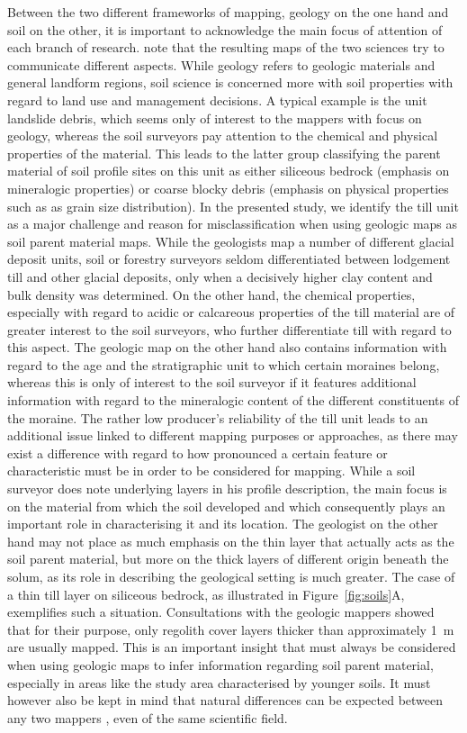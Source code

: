 \documentclass[preprint,12pt,authoryear]{elsarticle}
\begin{document}
Between the two different frameworks of mapping, geology on the one hand and soil on the other, it is important to acknowledge the main focus of attention of each branch of research. \cite{Miller2015a} note that the resulting maps of the two sciences try to communicate different aspects. While geology refers to geologic materials and general landform regions, soil science is concerned more with soil properties with regard to land use and management decisions. A typical example is the unit landslide debris, which seems only of interest to the mappers with focus on geology, whereas the soil surveyors pay attention to the chemical and physical properties of the material. This leads to the latter group classifying the parent material of soil profile sites on this unit as either siliceous bedrock (emphasis on mineralogic properties) or coarse blocky debris (emphasis on  physical properties such as as grain size distribution). In the presented study, we identify the till unit as a major challenge and reason for misclassification when using geologic maps as soil parent material maps. While the geologists map a number of different glacial deposit units, soil or forestry surveyors seldom differentiated between lodgement till and other glacial deposits, only when a decisively higher clay content and bulk density was determined. On the other hand, the chemical properties, especially with regard to acidic or calcareous properties of the till material are of greater interest to the soil surveyors, who further differentiate till with regard to this aspect. The geologic map on the other hand also contains information with regard to the age and the stratigraphic unit to which certain moraines belong, whereas this is only of interest to the soil surveyor if it features additional information with regard to the mineralogic content of the different constituents of the moraine. The rather low producer's reliability  of the till unit leads to an additional issue linked to different mapping purposes or approaches, as there may exist a difference with regard to how pronounced a certain feature or characteristic must be in order to be considered for mapping. While a soil surveyor does note underlying layers in his profile description, the main focus is on the material from which the soil developed and which consequently plays an important role in characterising it and its location. The geologist on the other hand may not place as much emphasis on the thin layer that actually acts as the soil parent material, but more on the thick layers of different origin beneath the solum, as its role in describing the geological setting is much greater. The case of a thin till layer on siliceous bedrock, as illustrated in Figure~\ref{fig:soils}A, exemplifies such a situation. Consultations with the geologic mappers showed that for their purpose, only regolith cover layers thicker than approximately 1~m are usually mapped. This is an important insight that must always be considered when using geologic maps to infer information regarding soil parent material, especially in areas like the study area characterised by younger soils. It must however also be kept in mind that natural differences can be expected between any two mappers \citep{Miller2015a}, even of the same scientific field. 
\end{document}
